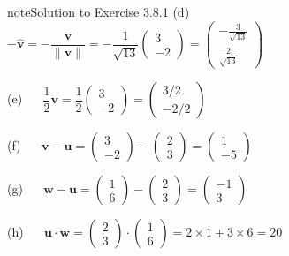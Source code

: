 \documentclass[letterpaper,10pt,english]{jupyterBook}
\begin{document}
\begin{sphinxadmonition}{note}{Solution to Exercise 3.8.1}
\sphinxAtStartPar
(d)   \(-\hat{\mathbf{v}} = -\dfrac{\mathbf{v}}{\|\mathbf{v}\|} = -\dfrac{1}{\sqrt{13}} \begin{pmatrix} 3 \\ -2 \end{pmatrix} = \begin{pmatrix} -\frac{3}{\sqrt{13}} \\ \frac{2}{\sqrt{13}} \end{pmatrix}\)

\sphinxAtStartPar
(e)   \(\dfrac{1}{2}\mathbf{v} = \dfrac{1}{2} \begin{pmatrix} 3 \\ -2 \end{pmatrix} 
= \begin{pmatrix} 3 / 2 \\ -2 / 2 \end{pmatrix}\)

\sphinxAtStartPar
(f)   \(\mathbf{v} - \mathbf{u} = \begin{pmatrix} 3 \\ -2 \end{pmatrix} - \begin{pmatrix} 2 \\ 3 \end{pmatrix}= \begin{pmatrix} 1 \\ -5 \end{pmatrix}\)

\sphinxAtStartPar
(g)   \(\mathbf{w} - \mathbf{u} = \begin{pmatrix} 1 \\ 6 \end{pmatrix} - \begin{pmatrix} 2 \\ 3 \end{pmatrix} = \begin{pmatrix} -1 \\ 3 \end{pmatrix}\)

\sphinxAtStartPar
(h)   \(\mathbf{u} \cdot \mathbf{w} = \begin{pmatrix} 2 \\ 3 \end{pmatrix} \cdot \begin{pmatrix} 1 \\ 6 \end{pmatrix} = 2 \times 1 + 3 \times 6 = 20\)


\end{sphinxadmonition}
\end{document}
